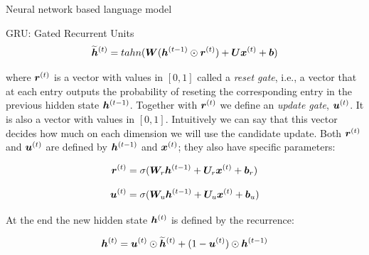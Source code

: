 \documentclass[10pt]{beamer}
\begin{document}
\begin{frame}{Neural network based language model}

\end{frame}



\begin{frame}{GRU: Gated Recurrent Units}
\begin{equation}
\bm{\widetilde{h}}^{(t)} = tahn(\bm{W} (\bm{h}^{(t-1)} \odot  \bm{r}^{(t)}) + \bm{U} \bm{x}^{(t)} + \bm{b})
\end{equation}

where $\bm{r}^{(t)}$ is a vector with values in $[0, 1]$ called a \textit{reset gate}, i.e.,  a vector that at each entry outputs the probability of reseting the  corresponding entry in the previous hidden state $\bm{h}^{(t-1)}$. Together with $\bm{r}^{(t)}$ we define an \textit{update gate}, $\bm{u}^{(t)}$. It is also a vector with values in $[0, 1]$. Intuitively we can say that this vector decides how much on each dimension we will use the candidate update. Both $\bm{r}^{(t)}$ and $\bm{u}^{(t)}$ are defined by $\bm{h}^{(t-1)}$ and $\bm{x}^{(t)}$; they also have specific parameters:

\begin{equation}
\bm{r}^{(t)} = \sigma(\bm{W}_{r} \bm{h}^{(t-1)} + \bm{U}_{r} \bm{x}^{(t)} + \bm{b}_{r})
\end{equation}


\begin{equation}
\bm{u}^{(t)} = \sigma(\bm{W}_{u} \bm{h}^{(t-1)} + \bm{U}_{u} \bm{x}^{(t)} + \bm{b}_{u})
\end{equation}

At the end the new hidden state $\bm{h}^{(t)}$ is defined by the recurrence:

\begin{equation}
\bm{h}^{(t)} = \bm{u}^{(t)} \odot \bm{\widetilde{h}}^{(t)} + (1 - \bm{u}^{(t)}) \odot \bm{h}^{(t-1)} 
\end{equation}

\end{frame}
\end{document}
